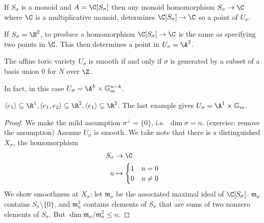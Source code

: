 \documentclass[a4paper]{article}
\begin{document}
If \(S_\sigma\) is a monoid and \(A = \C[S_\sigma]\) then any monoid homomorphism \(S_\sigma \to \C\) where \(\C\) is a multiplicative monoid, determines \(\C[S_\sigma] \to \C\) so a point of \(U_\sigma\).

\begin{eg}
  If \(S_\sigma = \N^2\), to produce a homomorphism \(\C[S_\sigma] \to \C\) is the same as specifying two points in \(\C\). This then determines a point in \(U_\sigma = \A^2\).
\end{eg}

\begin{proposition}
  The affine toric variety \(U_\sigma\) is smooth if and only if \(\sigma\) is generated by a subset of a basis union \(0\) for \(N\) over \(\Z\).
\end{proposition}

In fact, in this case \(U_\sigma = \A^k \times \mathbb G_m^{n - k}\).

\begin{eg}
  \(\langle e_1\rangle \subseteq \R^1, \langle e_1, e_2 \rangle \subseteq \R^2, \langle e_1 \rangle \subseteq \R^2\). The last example gives \(U_\sigma = \A^1 \times \mathbb G_m\).
\end{eg}

\begin{proof}
  We make the mild assumption \(\sigma^\perp = \{0\}\), i.e.\ \(\dim \sigma = n\). (exercise: remove the assumption) Assume \(U_\sigma\) is smooth. We take note that there is a distinguished \(X_\sigma\), the homomorphism
  \begin{align*}
    S_\sigma &\to \C \\
    u &\mapsto
        \begin{cases}
          1 & u = 0 \\
          0 & u \neq 0
        \end{cases}
  \end{align*}
  We show smoothness at \(X_\sigma\): let \(\mathfrak m_\sigma\) be the associated maximal ideal of \(\C[S_\sigma]\). \(\mathfrak m_\sigma\) contains \(S_\sigma \setminus \{0\}\), and \(\mathfrak m_\sigma^2\) contains elements of \(S_\sigma\) that are sums of two nonzero elements of \(S_\sigma\). But \(\dim \mathfrak m_\sigma/\mathfrak m_\sigma^2 \leq n\).
\end{proof}



\printindex
\end{document}
